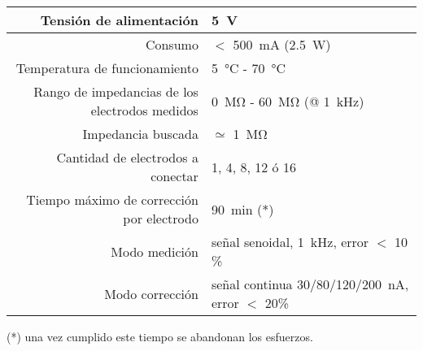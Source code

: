 \begin{table}[H]
\begin{center}
\begin{tabular}{|r|l|}
    \hline
    Tensión de alimentación &
    \SI{5}{\volt} \\ \hline
    Consumo &
    $<$ \SI{500}{\milli\ampere} (\SI{2.5}{\watt}) \\ \hline
    Temperatura de funcionamiento &
    \SI{5}{\celsius} - \SI{70}{\celsius} \\ \hline
    Rango de impedancias de los electrodos medidos &
    \SI{0}{\mega\ohm} - \SI{60}{\mega\ohm} (@ \SI{1}{\kilo\hertz})\\ \hline
    Impedancia buscada & $\simeq$ \SI{1}{\mega\ohm}\\ \hline
    Cantidad de electrodos a conectar &
    1, 4, 8, 12 ó 16 \\ \hline
    Tiempo máximo de corrección por electrodo &
    \SI{90}{\minute} (*)\\ \hline
    Modo medición & señal senoidal, \SI{1}{\kilo\hertz}, error $<$ 10 \% \\ \hline
    Modo corrección & señal continua 30/80/120/\SI{200}{\nano\ampere}, error $<$ 20\% \\ \hline
\end{tabular}
\end{center}
\end{table}

(*) una vez cumplido este tiempo se abandonan los esfuerzos.



